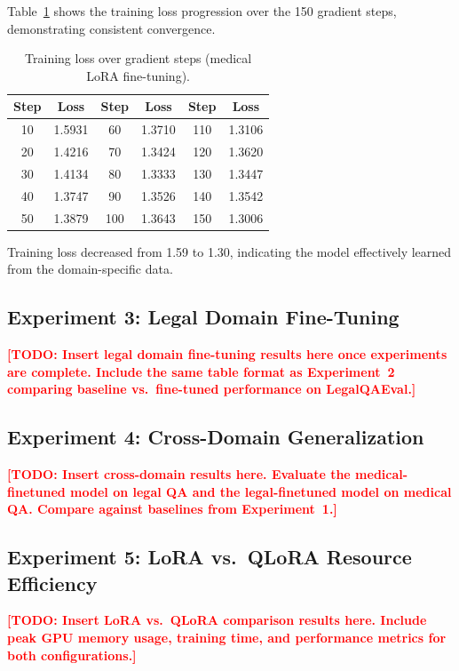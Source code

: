 \documentclass[12pt, letterpaper]{article}
\newcommand{\todo}[1]{\textcolor{red}{\textbf{[TODO: #1]}}}
\begin{document}
Table~\ref{tab:training-loss} shows the training loss progression over the 150 gradient steps, demonstrating consistent convergence.

\begin{table}[H]
\centering
\caption{Training loss over gradient steps (medical LoRA fine-tuning).}
\label{tab:training-loss}
\begin{tabular}{cc|cc|cc}
\toprule
\textbf{Step} & \textbf{Loss} & \textbf{Step} & \textbf{Loss} & \textbf{Step} & \textbf{Loss} \\
\midrule
10  & 1.5931 & 60  & 1.3710 & 110 & 1.3106 \\
20  & 1.4216 & 70  & 1.3424 & 120 & 1.3620 \\
30  & 1.4134 & 80  & 1.3333 & 130 & 1.3447 \\
40  & 1.3747 & 90  & 1.3526 & 140 & 1.3542 \\
50  & 1.3879 & 100 & 1.3643 & 150 & 1.3006 \\
\bottomrule
\end{tabular}
\end{table}

Training loss decreased from 1.59 to 1.30, indicating the model effectively learned from the domain-specific data.

\subsection{Experiment 3: Legal Domain Fine-Tuning}

\todo{Insert legal domain fine-tuning results here once experiments are complete. Include the same table format as Experiment~2 comparing baseline vs.\ fine-tuned performance on LegalQAEval.}

\subsection{Experiment 4: Cross-Domain Generalization}

\todo{Insert cross-domain results here. Evaluate the medical-finetuned model on legal QA and the legal-finetuned model on medical QA. Compare against baselines from Experiment~1.}

\subsection{Experiment 5: LoRA vs.\ QLoRA Resource Efficiency}

\todo{Insert LoRA vs.\ QLoRA comparison results here. Include peak GPU memory usage, training time, and performance metrics for both configurations.}
\end{document}
